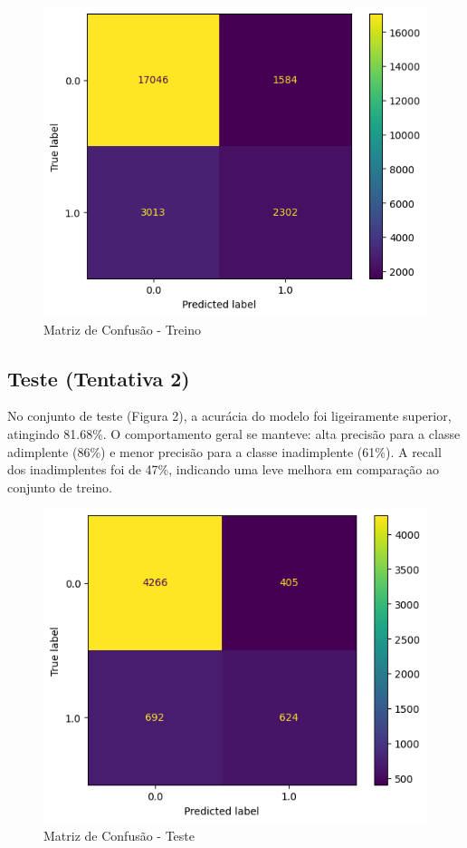 \documentclass{abntpuc}
\begin{document}
\begin{figure}[H]
    \centering
    \includegraphics[width=\textwidth]{grafico7.png}
    \caption{Matriz de Confusão - Treino}
    \centering
\end{figure}

\subsection*{\centering\large\textbf{Teste (Tentativa 2)}}

No conjunto de teste (Figura 2), a acurácia do modelo foi ligeiramente superior, atingindo 81.68\%. O comportamento geral se manteve: alta precisão para a classe adimplente (86\%) e menor precisão para a classe inadimplente (61\%). A recall dos inadimplentes foi de 47\%, indicando uma leve melhora em comparação ao conjunto de treino.

\begin{figure}[H]
    \centering
    \includegraphics[width=\textwidth]{grafico8.png}
    \caption{Matriz de Confusão - Teste}
\end{figure}
\end{document}
